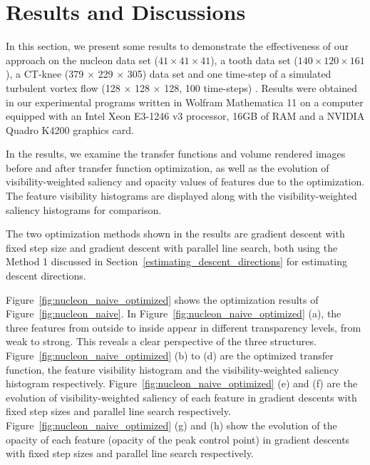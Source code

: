 \section{Results and Discussions}
In this section, we present some results to demonstrate the effectiveness of our approach on the nucleon data set ($ 41 \times 41 \times 41 $), a tooth data set ($ 140 \times 120 \times 161 $), a CT-knee (379 $ \times $ 229 $ \times $ 305) data set \cite{website:Roettger_volume_2013} and one time-step of a simulated turbulent vortex flow (128 $\times$ 128 $\times$ 128, 100 time-steps) \cite{website:Ma_repository_2013}.
Results were obtained in our experimental programs written in Wolfram Mathematica 11 on a computer equipped with an Intel Xeon E3-1246 v3 processor, 16GB of RAM and a NVIDIA Quadro K4200 graphics card.

In the results, we examine the transfer functions and volume rendered images before and after transfer function optimization, as well as the evolution of visibility-weighted saliency and opacity values of features due to the optimization.
The feature visibility histograms \cite{wang_efficient_2011} are displayed along with the visibility-weighted saliency histograms for comparison.

The two optimization methods shown in the results are gradient descent with fixed step size and gradient descent with parallel line search, both using the Method 1 discussed in Section~\ref{estimating_descent_directions} for estimating descent directions.

Figure~\ref{fig:nucleon_naive_optimized} shows the optimization results of Figure~\ref{fig:nucleon_naive}. In Figure~\ref{fig:nucleon_naive_optimized} (a), the three features from outside to inside appear in different transparency levels, from weak to strong. This reveals a clear perspective of the three structures.
Figure~\ref{fig:nucleon_naive_optimized} (b) to (d) are the optimized transfer function, the feature visibility histogram and the visibility-weighted saliency histogram respectively.
Figure~\ref{fig:nucleon_naive_optimized} (e) and (f) are the evolution of visibility-weighted saliency of each feature in gradient descents with fixed step sizes and parallel line search respectively. Figure~\ref{fig:nucleon_naive_optimized} (g) and (h) show the evolution of the opacity of each feature (opacity of the peak control point) in gradient descents with fixed step sizes and parallel line search respectively.

